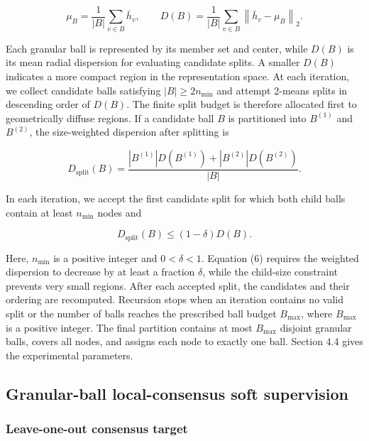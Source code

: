 \documentclass[preprint,12pt]{elsarticle}
\begin{document}
\begin{equation}\label{eq:4}
\mu_{B} = \frac{1}{|B|}\sum_{v \in B}{\bar{h}}_{v},\quad\quad D(B) = \frac{1}{|B|}\sum_{v \in B}\left\| {\bar{h}}_{v} - \mu_{B} \right\|_{2}.
\end{equation}

Each granular ball is represented by its member set and center, while \(D(B)\) is its mean radial dispersion for evaluating candidate splits. A smaller \(D(B)\) indicates a more compact region in the representation space. At each iteration, we collect candidate balls satisfying \(|B| \geq 2n_{\min}\) and attempt 2-means splits in descending order of \(D(B)\). The finite split budget is therefore allocated first to geometrically diffuse regions. If a candidate ball \(B\) is partitioned into \(B^{(1)}\) and \(B^{(2)}\), the size-weighted dispersion after splitting is

\begin{equation}\label{eq:5}
D_{\mathrm{split}}(B) = \frac{|B^{(1)}|D(B^{(1)}) + |B^{(2)}|D(B^{(2)})}{|B|}.
\end{equation}

In each iteration, we accept the first candidate split for which both child balls contain at least \(n_{\min}\) nodes and

\begin{equation}\label{eq:6}
D_{\mathrm{split}}(B) \leq (1 - \delta)D(B).
\end{equation}

Here, \(n_{\min}\) is a positive integer and \(0 < \delta < 1\). Equation (6) requires the weighted dispersion to decrease by at least a fraction \(\delta\), while the child-size constraint prevents very small regions. After each accepted split, the candidates and their ordering are recomputed. Recursion stops when an iteration contains no valid split or the number of balls reaches the prescribed ball budget \(B_{\max}\), where \(B_{\max}\) is a positive integer. The final partition contains at most \(B_{\max}\) disjoint granular balls, covers all nodes, and assigns each node to exactly one ball. Section 4.4 gives the experimental parameters.

\subsection{Granular-ball local-consensus soft supervision}\label{sec:3.4}

\subsubsection{Leave-one-out consensus target}\label{sec:3.4.1}
\end{document}
